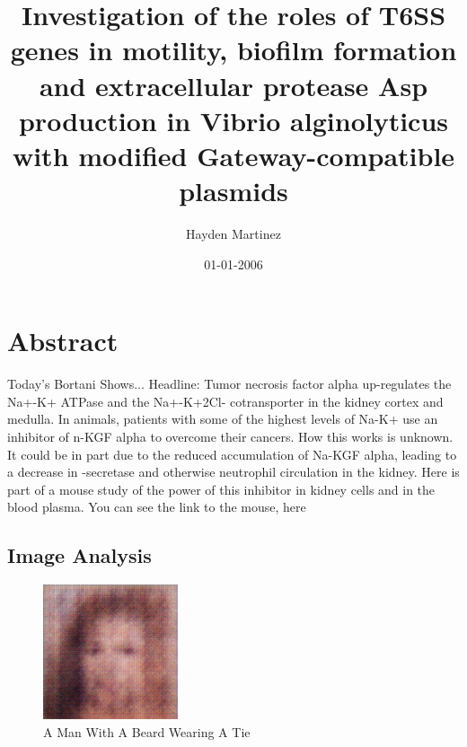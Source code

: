 \documentclass{article}%
\title{Investigation of the roles of T6SS genes in motility, biofilm formation and extracellular protease Asp production in Vibrio alginolyticus with modified Gateway{-}compatible plasmids}%
\author{Hayden Martinez}%
\affil{Program in Developmental Biology, Baylor College of Medicine, Houston, Texas, United States of America}%
\date{01{-}01{-}2006}%
\begin{document}
%
\normalsize%
\maketitle%
\section{Abstract}%
\label{sec:Abstract}%
Today's Bortani Shows...\newline%
Headline:\newline%
Tumor necrosis factor alpha up{-}regulates the Na+{-}K+ ATPase and the Na+{-}K+2Cl{-} cotransporter in the kidney cortex and medulla.\newline%
In animals, patients with some of the highest levels of Na{-}K+ use an inhibitor of n{-}KGF alpha to overcome their cancers. How this works is unknown. It could be in part due to the reduced accumulation of Na{-}KGF alpha, leading to a decrease in {-}secretase and otherwise neutrophil circulation in the kidney.\newline%
Here is part of a mouse study of the power of this inhibitor in kidney cells and in the blood plasma.\newline%
You can see the link to the mouse, here

%
\subsection{Image Analysis}%
\label{subsec:ImageAnalysis}%


\begin{figure}[h!]%
\centering%
\includegraphics[width=150px]{500_fake_images/samples_5_431.png}%
\caption{A Man With A Beard Wearing A Tie}%
\end{figure}

%
\end{document}

